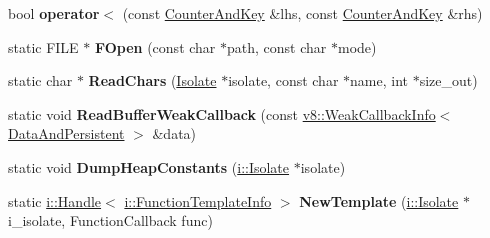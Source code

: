 \begin{DoxyCompactItemize}
\item 
bool {\bfseries operator$<$} (const \hyperlink{structv8_1_1_counter_and_key}{Counter\+And\+Key} \&lhs, const \hyperlink{structv8_1_1_counter_and_key}{Counter\+And\+Key} \&rhs)\hypertarget{namespacev8_a40f565d5ff2945b209a8beff63401e51}{}\label{namespacev8_a40f565d5ff2945b209a8beff63401e51}

\item 
static F\+I\+LE $\ast$ {\bfseries F\+Open} (const char $\ast$path, const char $\ast$mode)\hypertarget{namespacev8_ae96d63c686103259f2b033fc8a05dc64}{}\label{namespacev8_ae96d63c686103259f2b033fc8a05dc64}

\item 
static char $\ast$ {\bfseries Read\+Chars} (\hyperlink{classv8_1_1_isolate}{Isolate} $\ast$isolate, const char $\ast$name, int $\ast$size\+\_\+out)\hypertarget{namespacev8_acc98973b8ae532f98e3fdcc15e6eed76}{}\label{namespacev8_acc98973b8ae532f98e3fdcc15e6eed76}

\item 
static void {\bfseries Read\+Buffer\+Weak\+Callback} (const \hyperlink{classv8_1_1_weak_callback_info}{v8\+::\+Weak\+Callback\+Info}$<$ \hyperlink{structv8_1_1_data_and_persistent}{Data\+And\+Persistent} $>$ \&data)\hypertarget{namespacev8_ac2e1ecb6c8bf9fe59e9f33a572343e6c}{}\label{namespacev8_ac2e1ecb6c8bf9fe59e9f33a572343e6c}

\item 
static void {\bfseries Dump\+Heap\+Constants} (\hyperlink{classv8_1_1internal_1_1_isolate}{i\+::\+Isolate} $\ast$isolate)\hypertarget{namespacev8_a5f29ad843b8d5691178041c6d3c1d664}{}\label{namespacev8_a5f29ad843b8d5691178041c6d3c1d664}

\item 
static \hyperlink{classv8_1_1internal_1_1_handle}{i\+::\+Handle}$<$ \hyperlink{classv8_1_1internal_1_1_function_template_info}{i\+::\+Function\+Template\+Info} $>$ {\bfseries New\+Template} (\hyperlink{classv8_1_1internal_1_1_isolate}{i\+::\+Isolate} $\ast$i\+\_\+isolate, Function\+Callback func)\hypertarget{namespacev8_a176dab605e115d12bea1d8604e543f9e}{}\label{namespacev8_a176dab605e115d12bea1d8604e543f9e}

\end{DoxyCompactItemize}

